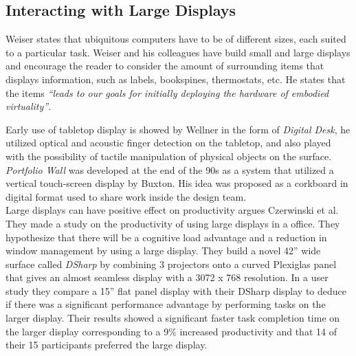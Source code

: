 \subsection{Interacting with Large Displays}
Weiser states that ubiquitous computers have to be of different sizes, each suited to a particular task. Weiser and his colleagues have build small and large displays and encourage the reader to consider the amount of surrounding items that displays information, such as labels, bookspines, thermostats, etc. He states that the items \emph{``leads to our goals for initially deploying the hardware of embodied virtuality''}.\cite{Weiser:1991} 

Early use of tabletop display is showed by Wellner in the form of \emph{Digital Desk}, he utilized optical and acoustic finger detection on the tabletop, and also played with the possibility of tactile manipulation of physical objects on the surface.\cite{Wellner:1993} \emph{Portfolio Wall} was developed at the end of the 90s as a system that utilized a vertical touch-screen display by Buxton\cite{Buxton:2000}. His idea was proposed as a corkboard in digital format used to share work inside the design team.\\

Large displays can have positive effect on productivity argues Czerwinski et al. They made a study on the productivity of using large displays in a office. They hypothesize that there will be a cognitive load advantage and a reduction in window management by using a large display. They build a novel 42'' wide surface called \emph{DSharp} by combining 3 projectors onto a curved Plexiglas panel that gives an almost seamless display with a 3072 x 768 resolution. In a user study they compare a 15'' flat panel display with their DSharp display to deduce if there was a significant performance advantage by performing tasks on the larger display. Their results showed a significant faster task completion time on the larger display corresponding to a 9\% increased productivity and that 14 of their 15 participants preferred the large display.

